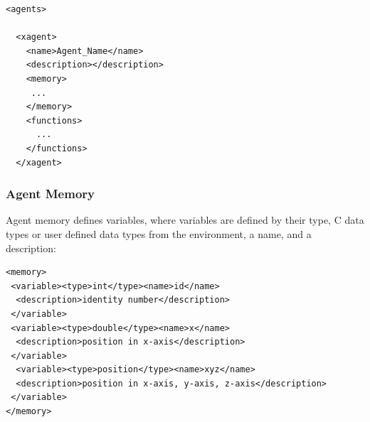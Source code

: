 \documentclass[a4paper,11pt]{article}
\newenvironment{mylisting}
{\begin{list}{}{\setlength{\leftmargin}{1em}}\item\small\bfseries}
{\end{list}}
\begin{document}
\begin{mylisting}
\begin{verbatim}
<agents>

  <xagent>
    <name>Agent_Name</name>
    <description></description>
    <memory>
     ...
    </memory>
    <functions>
      ...
    </functions>
  </xagent>
\end{verbatim}
\end{mylisting}
%


\subsubsection{Agent Memory}

Agent memory defines variables, where variables are defined by their
type, C data types or user defined data types from the environment,
a name, and a description:

\begin{mylisting}
\begin{verbatim}
<memory>
 <variable><type>int</type><name>id</name>
  <description>identity number</description>
 </variable>
 <variable><type>double</type><name>x</name>
  <description>position in x-axis</description>
 </variable>
  <variable><type>position</type><name>xyz</name>
  <description>position in x-axis, y-axis, z-axis</description>
 </variable>
</memory>
\end{verbatim}
\end{mylisting}
\end{document}
